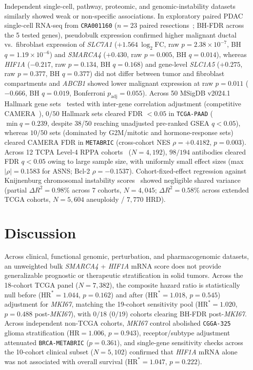 \documentclass[11pt]{article}
\begin{document}
Independent single-cell, pathway, proteomic, and genomic-instability datasets similarly showed weak or non-specific associations. In exploratory paired PDAC single-cell RNA-seq from \texttt{CRA001160} ($n = 23$ paired resections~\cite{peng2019,han2023}; BH-FDR across the 5 tested genes), pseudobulk expression confirmed higher malignant ductal vs.\ fibroblast expression of \textit{SLC7A1} ($+1.564\ \log_2\text{FC}$, raw $p = 2.38 \times 10^{-7}$, BH $q = 1.19 \times 10^{-6}$) and \textit{SMARCA4} ($+0.430$, raw $p = 0.005$, BH $q = 0.014$), whereas \textit{HIF1A} ($-0.217$, raw $p = 0.134$, BH $q = 0.168$) and gene-level \textit{SLC1A5} ($+0.275$, raw $p = 0.377$, BH $q = 0.377$) did not differ between tumor and fibroblast compartments and \textit{ABCB1} showed lower malignant expression at raw $p = 0.011$ ($-0.666$, BH $q = 0.019$, Bonferroni $p_{\text{adj}} = 0.055$). Across 50 MSigDB v2024.1 Hallmark gene sets~\cite{liberzon2015} tested with inter-gene correlation adjustment (competitive CAMERA~\cite{wu2012}), $0/50$ Hallmark sets cleared FDR $< 0.05$ in \texttt{TCGA-PAAD} ($\min q = 0.239$, despite 38/50 reaching unadjusted pre-ranked GSEA $q < 0.05$), whereas $10/50$ sets (dominated by G2M/mitotic and hormone-response sets) cleared CAMERA FDR in \texttt{METABRIC} (cross-cohort NES $\rho = +0.4182$, $p = 0.003$). Across 12 TCPA Level-4 RPPA cohorts~\cite{li2013} ($N = 4,192$), $98/194$ antibodies cleared FDR $q < 0.05$ owing to large sample size, with uniformly small effect sizes (max $|\rho| = 0.1583$ for ASNS; Bcl-2 $\rho = -0.1537$). Cohort-fixed-effect regression against Knijnenburg chromosomal instability scores~\cite{knijnenburg2018} showed negligible shared variance (partial $\Delta R^2 = 0.98\%$ across 7 cohorts, $N = 4,045$; $\Delta R^2 = 0.58\%$ across extended TCGA cohorts, $N = 5,604$ aneuploidy / $7,770$ HRD).

\section{Discussion}
Across clinical, functional genomic, perturbation, and pharmacogenomic datasets, an unweighted bulk \textit{SMARCA4} + \textit{HIF1A} mRNA score does not provide generalizable prognostic or therapeutic stratification in solid tumors. Across the 18-cohort TCGA panel ($N = 7,382$), the composite hazard ratio is statistically null before ($\text{HR}^* = 1.044$, $p = 0.162$) and after ($\text{HR}^* = 1.018$, $p = 0.545$) adjustment for \textit{MKI67}, matching the 19-cohort sensitivity pool ($\text{HR}^* = 1.020$, $p = 0.488$ post-\textit{MKI67}), with $0/18$ ($0/19$) cohorts clearing BH-FDR post-\textit{MKI67}. Across independent non-TCGA cohorts, \textit{MKI67} control abolished \texttt{CGGA-325} glioma stratification ($\text{HR} = 1.006$, $p = 0.943$), receptor/subtype adjustment attenuated \texttt{BRCA-METABRIC} ($p = 0.361$), and single-gene sensitivity checks across the 10-cohort clinical subset ($N = 5,102$) confirmed that \textit{HIF1A} mRNA alone was not associated with overall survival ($\text{HR}^* = 1.047$, $p = 0.222$).
\end{document}
